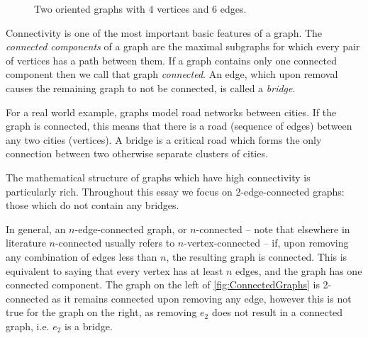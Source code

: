\documentclass[12pt]{report}
\theoremstyle{definition}
\theoremstyle{upright}
\begin{document}
\begin{figure}[htbp]
\begin{center}
\begin{subfigure}[c]{0.45\linewidth}
\begin{center}
                
            \end{center}
            
        \end{subfigure}
    
    \end{center}

    \caption{Two oriented graphs with $4$ vertices and $6$ edges.}\label{fig:OrientedGraphs}

\end{figure}

Connectivity is one of the most important basic features of a graph.
The \textit{connected components} of a graph are the maximal subgraphs for which every pair of vertices has a path between them.
If a graph contains only one connected component then we call that graph \textit{connected}.
An edge, which upon removal causes the remaining graph to not be connected, is called a \textit{bridge}.

For a real world example, graphs model road networks between cities.
If the graph is connected, this means that there is a road (sequence of edges) between any two cities (vertices).
A bridge is a critical road which forms the only connection between two otherwise separate clusters of cities.

The mathematical structure of graphs which have high connectivity is particularly rich.
Throughout this essay we focus on 2-edge-connected graphs: those which do not contain any bridges.

In general, an $n$-edge-connected graph, or $n$-connected -- note that elsewhere in literature $n$-connected usually refers to $n$-vertex-connected -- if, upon removing any combination of edges less than $n$, the resulting graph is connected.
This is equivalent to saying that every vertex has at least $n$ edges, and the graph has one connected component.
The graph on the left of \cref{fig:ConnectedGraphs} is 2-connected as it remains connected upon removing any edge, however this is not true for the graph on the right, as removing $e_2$ does not result in a connected graph, i.e. $e_2$ is a bridge.
\end{document}

